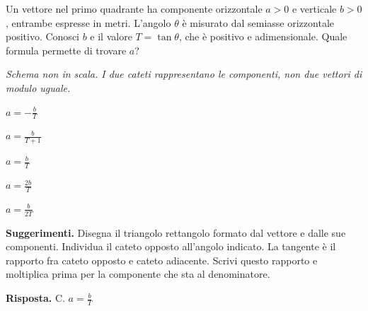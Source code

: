\documentclass[11pt,a4paper]{article}
\begin{document}
\begin{samepage}
\par\smallskip
Un vettore nel primo quadrante ha componente orizzontale \(a>0\) e verticale \(b>0\), entrambe espresse in metri. L’angolo \(\theta\) è misurato dal semiasse orizzontale positivo. Conosci \(b\) e il valore \(T=\tan\theta\), che è positivo e adimensionale. Quale formula permette di trovare \(a\)?\par

\begin{center}
\par
\small\itshape Schema non in scala. I due cateti rappresentano le componenti, non due vettori di modulo uguale.
\end{center}
\begin{list}{}{\setlength{\leftmargin}{1.4em}\setlength{\itemsep}{.1em}\setlength{\parsep}{0pt}}\small
\item[A.] \(a=-\frac{b}{T}\)
\item[B.] \(a=\frac{b}{T+1}\)
\item[C.] \(a=\frac{b}{T}\)
\item[D.] \(a=\frac{2b}{T}\)
\item[E.] \(a=\frac{b}{2T}\)
\end{list}
{\small\textbf{Suggerimenti.} Disegna il triangolo rettangolo formato dal vettore e dalle sue componenti. Individua il cateto opposto all’angolo indicato. La tangente è il rapporto fra cateto opposto e cateto adiacente. Scrivi questo rapporto e moltiplica prima per la componente che sta al denominatore.\par}
\medskip\noindent\textbf{Risposta.} C. \(a=\frac{b}{T}\)\par



\end{samepage}
\end{document}
